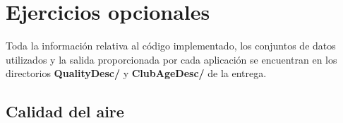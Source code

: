 \documentclass[10pt,swedish, openany]{book}
\begin{document}

\chapter{Ejercicios opcionales}

Toda la información relativa al código implementado, los conjuntos de datos utilizados y la salida proporcionada por cada aplicación se encuentran en los directorios \textbf{QualityDesc/} y \textbf{ClubAgeDesc/} de la entrega.


\section{Calidad del aire}
\end{document}
